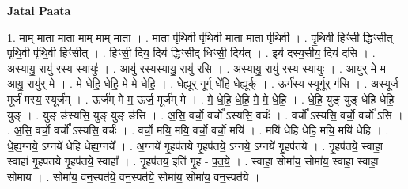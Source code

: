 \documentclass[17pt]{extarticle}
\begin{document}
\textbf{Jatai Paata} \newline

1. माम् मा॒ता मा॒ता माम् माम् मा॒ता । . मा॒ता पृ॑थि॒वी पृ॑थि॒वी मा॒ता मा॒ता पृ॑थि॒वी । . पृ॒थि॒वी हिꣳ॑सी द्धिꣳसीत् पृथि॒वी पृ॑थि॒वी हिꣳ॑सीत् । . हिꣳ॒॒सी॒ दिय॒ दिय॑ द्धिꣳसीद् धिꣳसी॒ दिय॑त् । . इय॑ दस्य॒सीय॒ दिय॑ दसि । . अ॒स्यायु॒ रायु॑ रस्य॒ स्यायुः॑ । . आयु॑ रस्य॒स्यायु॒ रायु॑ रसि । . अ॒स्यायु॒ रायु॑ रस्य॒ स्यायुः॑ । . आयु॑र् मे म॒ आयु॒ रायु॑र् मे । . मे॒ धे॒हि॒ धे॒हि॒ मे॒ मे॒ धे॒हि॒ । . धे॒ह्यूर् गूर्ग् धे॑हि धे॒ह्यूर्क् । . ऊर्ग॑स्य॒ स्यूर्गूर् ग॑सि । . अ॒स्यूर्ज॒ मूर्ज॑ मस्य॒ स्यूर्ज᳚म् । . ऊर्ज॑म् मे म॒ ऊर्ज॒ मूर्ज॑म् मे । . मे॒ धे॒हि॒ धे॒हि॒ मे॒ मे॒ धे॒हि॒ । . धे॒हि॒ युङ् युङ् धे॑हि धेहि॒ युङ् । . युङ् ङ॑स्यसि॒ युङ् युङ् ङ॑सि । . अ॒सि॒ वर्चो॒ वर्चो᳚ ऽस्यसि॒ वर्चः॑ । . वर्चो᳚ ऽस्यसि॒ वर्चो॒ वर्चो॑ ऽसि । . अ॒सि॒ वर्चो॒ वर्चो᳚ ऽस्यसि॒ वर्चः॑ । . वर्चो॒ मयि॒ मयि॒ वर्चो॒ वर्चो॒ मयि॑ । . मयि॑ धेहि धेहि॒ मयि॒ मयि॑ धेहि । . धे॒ह्य॒ग्नये॒ ऽग्नये॑ धेहि धेह्य॒ग्नये᳚ । . अ॒ग्नये॑ गृ॒हप॑तये गृ॒हप॑तये॒ ऽग्नये॒ ऽग्नये॑ गृ॒हप॑तये । . गृ॒हप॑तये॒ स्वाहा॒ स्वाहा॑ गृ॒हप॑तये गृ॒हप॑तये॒ स्वाहा᳚ । . गृ॒हप॑तय॒ इति॑ गृ॒ह - प॒त॒ये॒ । . स्वाहा॒ सोमा॑य॒ सोमा॑य॒ स्वाहा॒ स्वाहा॒ सोमा॑य । . सोमा॑य॒ वन॒स्पत॑ये॒ वन॒स्पत॑ये॒ सोमा॑य॒ सोमा॑य॒ वन॒स्पत॑ये । \newline
\end{document}
